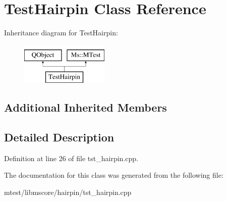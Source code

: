 \hypertarget{class_test_hairpin}{}\section{Test\+Hairpin Class Reference}
\label{class_test_hairpin}
Inheritance diagram for Test\+Hairpin\+:\begin{figure}[H]
\begin{center}
\leavevmode
\includegraphics[height=2.000000cm]{class_test_hairpin}
\end{center}
\end{figure}
\subsection*{Additional Inherited Members}


\subsection{Detailed Description}


Definition at line 26 of file tst\+\_\+hairpin.\+cpp.



The documentation for this class was generated from the following file\+:\begin{DoxyCompactItemize}
\item 
mtest/libmscore/hairpin/tst\+\_\+hairpin.\+cpp\end{DoxyCompactItemize}
